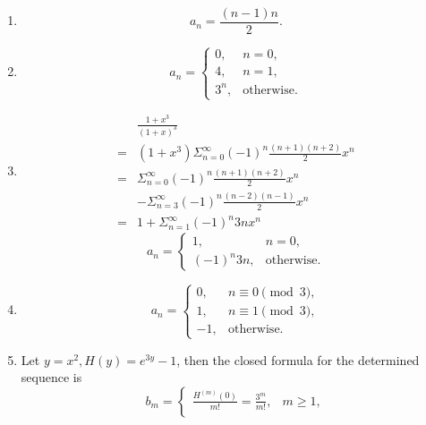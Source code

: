 \documentclass{../../cls/sig-alternate-05-2015}
\begin{document}
\begin{enumerate}
\begin{enumerate}
        \item \begin{equation}
            a_n = \frac{(n - 1)n}{2}.
        \end{equation}
        \item \begin{equation}
            a_n = \begin{cases}
                0, & n = 0,\\
                4, & n = 1,\\
                3^n, & \text{otherwise}.
            \end{cases}
        \end{equation}
        \item \begin{align}
            & \frac{1 + x^3}{(1 + x)^3}\\
            = & (1 + x^3) \Sigma_{n = 0}^\infty (-1)^n \frac{(n + 1)(n + 2)}{2} x^n\\
            = & \Sigma_{n = 0}^\infty (-1)^n \frac{(n + 1)(n + 2)}{2} x^n\\
            & - \Sigma_{n = 3}^\infty (-1)^n \frac{(n - 2)(n - 1)}{2} x^n\\
            = & 1 + \Sigma_{n = 1}^\infty (-1)^n 3n x^n
        \end{align}
        \begin{equation}
            a_n = \begin{cases}
            1, & n = 0,\\
            (-1)^n 3n, & \text{otherwise}.
            \end{cases}
        \end{equation}
        \item \begin{equation}
            a_n = \begin{cases}
                0, & n \equiv 0 \pmod{3},\\
                1, & n \equiv 1 \pmod{3},\\
                -1, & \text{otherwise}.
            \end{cases}
        \end{equation}
        \item Let $y = x^2, H(y) = e^{3y} - 1$, then the closed formula for the determined sequence is \begin{equation}
            b_m = \begin{cases}
            \frac{H^{(m)}(0)}{m!} = \frac{3^m}{m!}, & m \ge 1,\\

\end{cases}
\end{equation}
\end{enumerate}
\end{enumerate}
\end{document}
